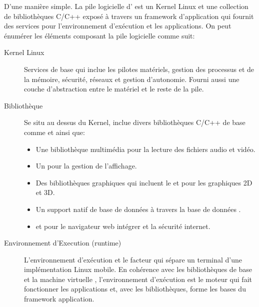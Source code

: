 D'une manière simple. La pile logicielle d'\android{} est un Kernel Linux et une collection de bibliothèques C/C++ exposé à travers un framework d'application qui fournit des services pour l'environnement d'exécution et les applications. On peut énumérer les éléments composant la pile logicielle comme suit:

\begin{description}

\item [Kernel Linux]
Services de base qui inclue les pilotes matériels, gestion des processus et de la mémoire, sécurité, réseaux et gestion d'autonomie. Fourni aussi une couche d'abstraction entre le matériel et le reste de la pile.

\item [Bibliothèque]
Se situ au dessus du Kernel, \android{} inclue divers bibliothèques C/C++ de base comme  et  ainsi que:

\begin{itemize}

\item Une bibliothèque multimédia pour la lecture des fichiers audio et vidéo.

\item Un  pour la gestion de l'affichage.

\item Des bibliothèques graphiques qui incluent le  et  pour les graphiques 2D et 3D.

\item Un support natif de base de données à travers la base de données .

\item {} et  pour le navigateur web intégrer et la sécurité internet.

\end{itemize}

\item [Environnement d'Execution (runtime) \android{}]

L'environnement d’exécution et le facteur qui sépare un terminal \android{}
d'une implémentation Linux mobile. En cohérence avec les bibliothèques de base
et la machine virtuelle , l'environnement d’exécution \android{} est
le moteur qui fait fonctionner les applications et, avec les bibliothèques,
forme les bases du framework application.

\begin{description}


\end{description}
\end{description}
